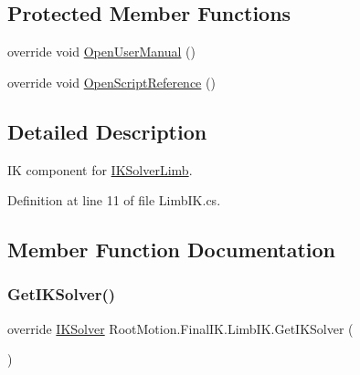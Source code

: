 \subsection*{Protected Member Functions}
\begin{DoxyCompactItemize}
\item 
override void \mbox{\hyperlink{class_root_motion_1_1_final_i_k_1_1_limb_i_k_a3f518043b978d7a162c7390b5b7c8ca3}{Open\+User\+Manual}} ()
\item 
override void \mbox{\hyperlink{class_root_motion_1_1_final_i_k_1_1_limb_i_k_a06dda0b6311aed7d024f2a286eb77c6c}{Open\+Script\+Reference}} ()
\end{DoxyCompactItemize}


\subsection{Detailed Description}
IK component for \mbox{\hyperlink{class_root_motion_1_1_final_i_k_1_1_i_k_solver_limb}{I\+K\+Solver\+Limb}}. 



Definition at line 11 of file Limb\+I\+K.\+cs.



\subsection{Member Function Documentation}
\mbox{\label{class_root_motion_1_1_final_i_k_1_1_limb_i_k_ad5769cba3e3e93e1872e59138e594e2c}} 
\subsubsection{\texorpdfstring{Get\+I\+K\+Solver()}{GetIKSolver()}}
{\footnotesize\ttfamily override \mbox{\hyperlink{class_root_motion_1_1_final_i_k_1_1_i_k_solver}{I\+K\+Solver}} Root\+Motion.\+Final\+I\+K.\+Limb\+I\+K.\+Get\+I\+K\+Solver (\begin{DoxyParamCaption}{ }\end{DoxyParamCaption})\hspace{0.3cm}{\ttfamily [virtual]}}



